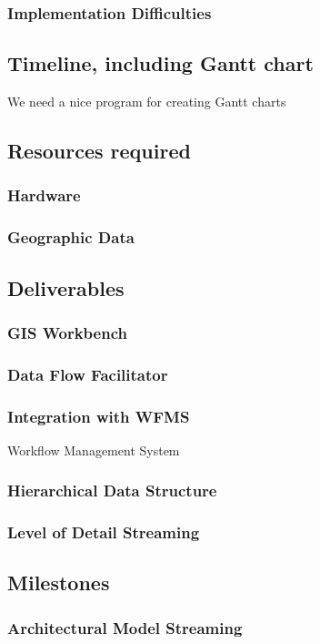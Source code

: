 \documentclass[12pt,a4paper]{article}
\begin{document}
\subsubsection*{Implementation Difficulties}
\subsection{Timeline, including Gantt chart}
We need a nice program for creating Gantt charts
\subsection{Resources required}
\subsubsection*{Hardware}
\subsubsection*{Geographic Data}
\subsection{Deliverables}
\subsubsection{GIS Workbench}
\subsubsection{Data Flow Facilitator}
\subsubsection{Integration with WFMS}
Workflow Management System
\subsubsection{Hierarchical Data Structure}
\subsubsection{Level of Detail Streaming}
\subsection{Milestones}
\subsubsection{Architectural Model Streaming}
\end{document}
